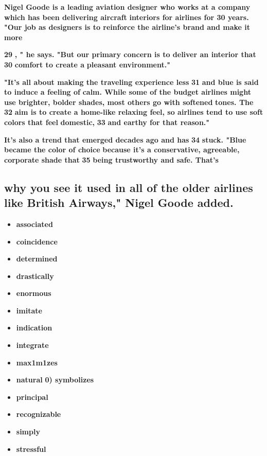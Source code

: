 \documentclass[UTF8,11pt]{ctexart}
\begin{document}
\textbf{Nigel Goode is a leading aviation designer who works at a company which has been delivering aircraft} \textbf{interiors for airlines for 30 years. "Our job as designers is to reinforce the airline's brand and make it more}


\textbf{29} \textbf{, " he says. "But our primary concern is to deliver an interior that} \textbf{30} \textbf{comfort to create a} \textbf{pleasant environment."}


\textbf{"It's all about making the traveling experience less} \textbf{31} \textbf{and blue is said to induce a feeling of} \textbf{calm. While some of the budget airlines might use brighter, bolder shades, most others go with softened} \textbf{tones. The} \textbf{32} \textbf{aim is to create a home-like relaxing feel, so airlines tend to use soft colors that feel} \textbf{domestic,} \textbf{33} \textbf{and earthy for that reason."}


\textbf{It's also a trend that emerged decades ago and has} \textbf{34} \textbf{stuck. "Blue became the color of choice} \textbf{because it's a conservative, agreeable, corporate shade that} \textbf{35} \textbf{being trustworthy and safe. That's}


\subsection*{\textbf{why you see it used in all of the older airlines like British Airways," Nigel Goode added.}}


\begin{itemize}[leftmargin=2em,itemsep=.2em,topsep=.4em]\item[A.] \textbf{associated}
\item[B.] \textbf{coincidence}
\item[C.] \textbf{determined}
\item[D.] \textbf{drastically}
\item[E.] \textbf{enormous}
\item[F.] \textbf{imitate}
\item[G.] \textbf{indication}
\item[H.] \textbf{integrate}
\item[I.] \textbf{max1m1zes}
\item[J.] \textbf{natural} \textbf{0) symbolizes}
\item[K.] \textbf{principal}
\item[L.] \textbf{recognizable}
\item[M.] \textbf{simply}
\item[N.] \textbf{stressful}
\end{itemize}
\end{document}
